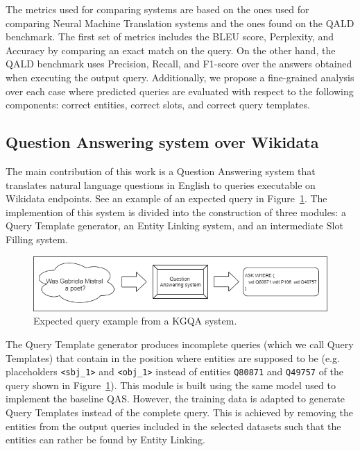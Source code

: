 The metrics used for comparing systems are based on the ones used for comparing Neural 
Machine Translation systems and the ones found on the QALD benchmark. The first set of 
metrics includes the BLEU score, Perplexity, and Accuracy by comparing an exact match on 
the \SPARQL{} query. On the other hand, the QALD benchmark uses Precision, Recall, and F1-score 
over the answers obtained when executing the output \SPARQL{} query. Additionally, 
we propose a fine-grained analysis over each case where predicted queries are evaluated with 
respect to the following components: correct entities, correct slots, and correct query 
templates.

\subsection*{Question Answering system over Wikidata}
\label{cap1:intro/contributions/qaWikidata}

The main contribution of this work is a Question Answering system that translates 
natural language questions in English to \SPARQL{} queries executable on Wikidata endpoints. See an
example of an expected \SPARQL{} query in Figure~\ref{fig:introQAexample}. The implemention of this 
system is divided into the construction of three modules: a Query Template generator, 
an Entity Linking system, and an intermediate Slot Filling system. 

\begin{figure}[!h]
    \centering
    \includegraphics[scale=.5]{imagenes/1_intro/introQuestionAnsweringExample.png}
    \caption{Expected \SPARQL{} query example from a KGQA system.}
    \label{fig:introQAexample}
\end{figure}

The Query Template generator produces incomplete \SPARQL{} queries (which we call 
Query Templates) that contain  in the position where entities are 
supposed to be (e.g. placeholders \texttt{<sbj\_1>} and \texttt{<obj\_1>} instead of entities 
\texttt{Q80871} and \texttt{Q49757} of the query shown in Figure~\ref{fig:introQAexample}). 
This module is built using the same model used to implement the baseline QAS. 
However, the training data is adapted to generate Query Templates instead of the complete 
query. This is achieved by removing the entities from the output \SPARQL{} queries included 
in the selected datasets such that the entities can rather be found by Entity Linking.

